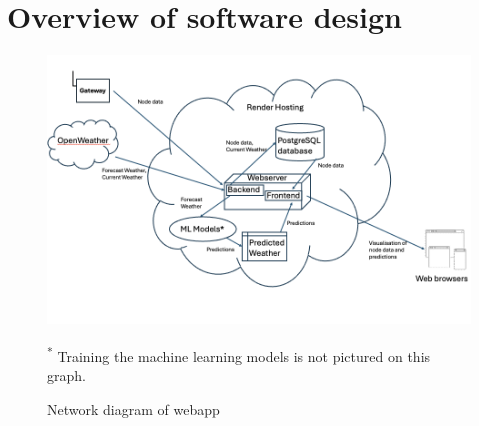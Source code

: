 \section{Overview of software design}\label{sec:software-overview}

\begin{figure}[H]
    \centering
    \includegraphics[width=1.1\textwidth]{contents/part-3/fig3/software-overview.png}
    \par\vspace{1pt} \noindent\begin{minipage}{0.95\textwidth}
    \centering\footnotesize\textsuperscript{*} Training the machine learning
    models is not pictured on this graph.
    \end{minipage}
    \par\vspace{1pt}
    \caption{Network diagram of webapp}
    \label{fig:software-schema}
\end{figure}